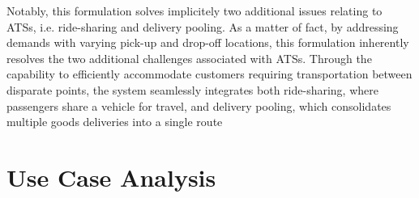 Notably, this formulation solves implicitely two additional issues relating to ATSs, i.e. ride-sharing and delivery pooling. As a matter of fact, by addressing demands with varying pick-up and drop-off locations, this formulation inherently resolves the two additional challenges associated with ATSs. Through the capability to efficiently accommodate customers requiring transportation between disparate points, the system seamlessly integrates both ride-sharing, where passengers share a vehicle for travel, and delivery pooling, which consolidates multiple goods deliveries into a single route



\section{Use Case Analysis}\label{sec:use_case_analysis_ats}
